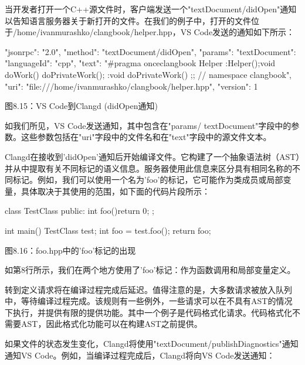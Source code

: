 
当开发者打开一个C++源文件时，客户端发送一个"textDocument/didOpen"通知以告知语言服务器关于新打开的文件。在我们的例子中，打开的文件位于/home/ivanmurashko/clangbook/helper.hpp，VS Code发送的通知如下所示：

\begin{shell}
{
  "jsonrpc": "2.0",
  "method": "textDocument/didOpen",
  "params": {
    "textDocument": {
      "languageId": "cpp",
      "text": "#pragma once\n\nnamespace clangbook {\nclass Helper {\npublic:\n  Helper(){};\n\n  void doWork() { doPrivateWork(); }\n\nprivate:\n  void doPrivateWork() {}\n};\n}; // namespace clangbook\n",
      "uri": "file:///home/ivanmurashko/clangbook/helper.hpp",
      "version": 1
     }
   }
}
\end{shell}


\begin{center}
图8.15：VS Code到Clangd (didOpen通知)
\end{center}

如我们所见，VS Code发送通知，其中包含在"params/ textDocument"字段中的参数。这些参数包括在"uri"字段中的文件名和在"text"字段中的源文件文本。

Clangd在接收到'didOpen'通知后开始编译文件。它构建了一个抽象语法树（AST）并从中提取有关不同标记的语义信息。服务器使用此信息来区分具有相同名称的不同标记。例如，我们可以使用一个名为'foo'的标记，它可能作为类成员或局部变量，具体取决于其使用的范围，如下面的代码片段所示：

\begin{cpp}
class TestClass {
public:
  int foo(){return 0};
};

int main() {
  TestClass test;
  int foo = test.foo();
  return foo;
}
\end{cpp}

\begin{center}
图8.16：foo.hpp中的'foo'标记的出现
\end{center}

如第8行所示，我们在两个地方使用了'foo'标记：作为函数调用和局部变量定义。

转到定义请求将在编译过程完成后延迟。值得注意的是，大多数请求被放入队列中，等待编译过程完成。该规则有一些例外，一些请求可以在不具有AST的情况下执行，并提供有限的提供功能。其中一个例子是代码格式化请求。代码格式化不需要AST，因此格式化功能可以在构建AST之前提供。

如果文件的状态发生变化，Clangd将使用"textDocument/publishDiagnostics"通知通知VS Code。例如，当编译过程完成后，Clangd将向VS Code发送通知：

